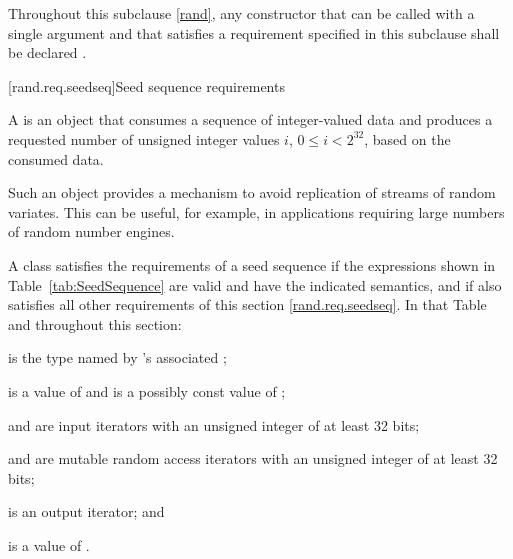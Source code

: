 \pnum
Throughout this subclause \ref{rand},
any constructor that can be called with a single argument
and that satisfies a requirement specified in this subclause
shall be declared .


[rand.req.seedseq]{Seed sequence requirements}%
%

\pnum
 A 
 is an object
 that consumes a sequence
 of integer-valued data
 and produces a requested number
 of unsigned integer values $i$, $ 0 \le i < 2^{32} $,
 based on the consumed data.
\begin{note}
 Such an object provides a mechanism
 to avoid replication of streams of random variates.
 This can be useful, for example, in applications
 requiring large numbers of random number engines.
\end{note}

\pnum
A class 
satisfies the requirements
of a seed sequence
if the expressions shown
in Table~\ref{tab:SeedSequence}
are valid and have the indicated semantics,
and if  also satisfies all other requirements
of this section \ref{rand.req.seedseq}.
In that Table and throughout this section:
\begin{enumeratea}
  \item
     is the type named by
    's associated ;
  \item
     is a value of 
    and
     is a possibly const value of ;
  \item
     and  are input iterators
    with an unsigned integer  of at least 32 bits;
  \item
     and  are mutable random access iterators
    with an unsigned integer  of at least 32 bits;
  \item
     is an output iterator;
  and
  \item
     is a value of .
\end{enumeratea}



